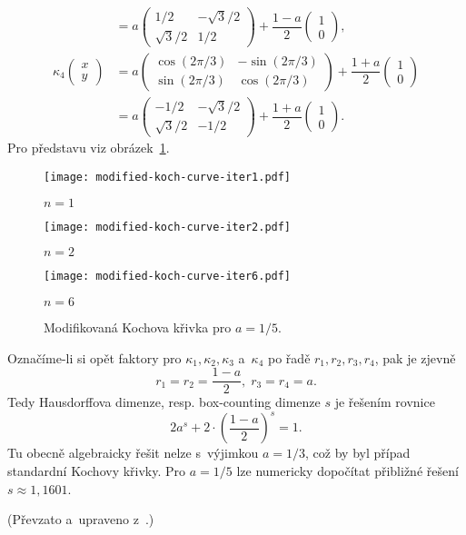 \begin{example}
\begin{align*}
        &=a\left(\begin{matrix}
            1/2 & -\sqrt{3}/2\\
            \sqrt{3}/2 & 1/2
        \end{matrix}\right)+\dfrac{1-a}{2}\left(\begin{matrix}
            1\\
            0
        \end{matrix}\right),\\
        \kappa_4\left(\begin{matrix}
            x\\
            y
        \end{matrix}\right)&=a\left(\begin{matrix}
            \cos(2\pi/3) & -\sin(2\pi/3)\\
            \sin(2\pi/3) & \cos(2\pi/3)
        \end{matrix}\right)+\dfrac{1+a}{2}\left(\begin{matrix}
            1\\
            0
        \end{matrix}\right)\\
        &=a\left(\begin{matrix}
            -1/2 & -\sqrt{3}/2\\
            \sqrt{3}/2 & -1/2
        \end{matrix}\right)+\dfrac{1+a}{2}\left(\begin{matrix}
            1\\
            0
        \end{matrix}\right).
    \end{align*}
    Pro představu viz obrázek~\ref{fig:modifikovana-kochova-krivka}.
    \begin{figure}[h]
        \centering
        \texttt{[image: modified-koch-curve-iter1.pdf]}
        \begin{center}
            $n=1$
        \end{center}
        \texttt{[image: modified-koch-curve-iter2.pdf]}
        \begin{center}
            $n=2$
        \end{center}
        \texttt{[image: modified-koch-curve-iter6.pdf]}
        \begin{center}
            $n=6$
        \end{center}
        \caption{Modifikovaná Kochova křivka pro $a=1/5$.}
        \label{fig:modifikovana-kochova-krivka}
    \end{figure}
    Označíme-li si opět faktory pro $\kappa_1,\kappa_2,\kappa_3$ a~$\kappa_4$ po řadě $r_1,r_2,r_3,r_4$, pak je zjevně
    \[r_1=r_2=\dfrac{1-a}{2},\;r_3=r_4=a.\]
    Tedy Hausdorffova dimenze, resp. box-counting dimenze $s$ je řešením rovnice
    \[2a^s+2\cdot\left(\dfrac{1-a}{2}\right)^s=1.\]
    Tu obecně algebraicky řešit nelze s~výjimkou $a=1/3$, což by byl případ standardní Kochovy křivky. Pro $a=1/5$ lze numericky dopočítat přibližné řešení $s\approx 1{,}1601$.
\end{example}
(Převzato a~upraveno z~\citep[str. 142]{Falconer1989}.)


